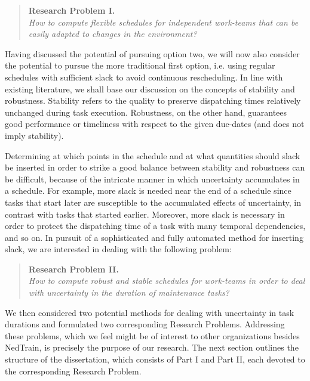 		\begin{quote}
			\textbf{Research Problem I.}\\
			\emph{How to compute flexible schedules for independent work-teams that can be easily adapted to changes in the environment?}
		\end{quote}

		Having discussed the potential of pursuing option two,
		we will now also consider the potential to pursue the more traditional first option, 
		i.e. using regular schedules with sufficient slack to avoid continuous rescheduling.
		In line with existing literature,
		we shall base our discussion on the concepts of stability and robustness. 
		Stability refers to the quality to preserve dispatching times relatively unchanged during task execution.
		Robustness, on the other hand, guarantees good performance or timeliness 
		with respect to the given due-dates (and does not imply stability). 

		Determining at which points in the schedule and at what quantities should slack be inserted 
		in order to strike a good balance between stability and robustness can be difficult,
		because of the intricate manner in which uncertainty accumulates in a schedule.
		For example, more slack is needed near the end of a schedule since
		tasks that start later are susceptible to the accumulated effects of uncertainty,
		in contrast with tasks that started earlier.
		Moreover, more slack is necessary in order to protect the 
		dispatching time of a task with many temporal dependencies, and so on.
		In pursuit of a sophisticated and fully automated method for inserting slack,
		we are interested in dealing with the following problem:

		\begin{quote}
			\textbf{Research Problem II.}\\
			\emph{How to compute robust and stable schedules for work-teams in order to deal with uncertainty in the duration of maintenance tasks?}
		\end{quote}

		We then considered two potential methods for dealing with uncertainty in task durations and formulated two corresponding Research Problems.
		Addressing these problems, which we feel might be of interest to other organizations besides NedTrain,
		is precisely the purpose of our research.
		The next section outlines the structure of the dissertation, 
		which consists of Part I and Part II, 
		each devoted to the corresponding Research Problem.

